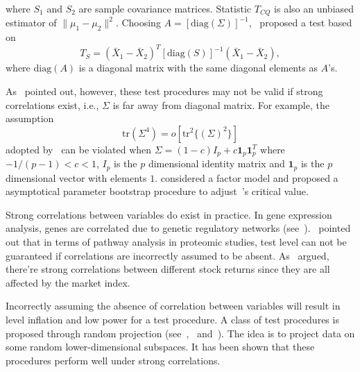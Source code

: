 \documentclass[review]{elsarticle}
\theoremstyle{plain}
\theoremstyle{definition}
\theoremstyle{remark}
\begin{document}
where $S_1$ and $S_2$ are sample covariance matrices. Statistic $T_{CQ}$ 
is also an unbiased estimator of $\|\mu_1-\mu_2\|^2$. Choosing $A={[\mathrm{diag}(\Sigma)]}^{-1}$,~\cite{Srivastava2008A} proposed a test based on
\begin{equation*}
    T_{S}={(\bar{X}_1-\bar{X}_2)}^T {[\mathrm{diag}(S)]}^{-1}(\bar{X}_1-\bar{X}_2),
\end{equation*}
where $\textrm{diag} (A)$ is a diagonal matrix with the same diagonal elements as $A$'s.

As~\cite{Ma2015A} pointed out, however, these test procedures may not be valid if strong correlations exist, i.e., $\Sigma$ is far away from diagonal matrix. For example, the assumption 
\begin{equation}\label{chenscondition}
\mathrm{tr}(\Sigma^4)=o[\mathrm{tr}^2\{{(\Sigma)}^2\}]
\end{equation}
adopted by~\cite{Chen2010A} can be violated when $\Sigma=(1-c)I_p+c\bm{1}_p \bm{1}_p^T$ where $-{1}/{(p-1)}<c<1$, $I_p$ is the $p$ dimensional identity matrix and $\bm{1}_p$ is the $p$ dimensional vector  with elements $1$.
\cite{Ma2015A} considered a factor model and proposed a asymptotical parameter bootstrap procedure to adjust~\cite{Chen2010A}'s critical value.

Strong correlations between variables do exist in practice. In gene expression analysis, genes are correlated due to genetic regulatory networks (see~\cite{Thulin2014A}).~\cite{Chen2011A} pointed out that in terms of pathway analysis in proteomic studies,  test level can not be guaranteed if correlations are incorrectly assumed to be absent.
 As~\cite{Ma2015A} argued, there're strong correlations between different stock returns since they are all affected by the market index.

Incorrectly assuming the absence of correlation between variables will result in level inflation and low power for a test procedure. A class of test procedures is proposed through random projection (see~\cite{Lopes2015A},~\cite{Thulin2014A} and~\cite{Srivastava2014RAPTT}). The idea is to project data on some random lower-dimensional subspaces. It has been shown that these
procedures perform well under strong correlations. 
\end{document}
